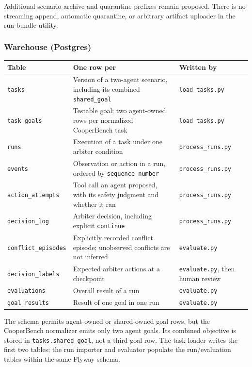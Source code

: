 \documentclass[11pt]{article}
\newcommand{\code}[1]{\texttt{#1}}
\begin{document}
Additional scenario-archive and quarantine prefixes remain proposed. There is no streaming append, automatic quarantine, or arbitrary artifact uploader in the run-bundle utility.

\subsubsection*{Warehouse (Postgres)}

{\small
\begin{tabularx}{\linewidth}{@{}L{3.4cm}YL{4.2cm}@{}}
\toprule
\textbf{Table} & \textbf{One row per} & \textbf{Written by} \\
\midrule
\code{tasks} & Version of a two-agent scenario, including its combined \code{shared\_goal} & \code{load\_tasks.py} \\
\code{task\_goals} & Testable goal; two agent-owned rows per normalized CooperBench task & \code{load\_tasks.py} \\
\code{runs} & Execution of a task under one arbiter condition & \code{process\_runs.py} \\
\code{events} & Observation or action in a run, ordered by \code{sequence\_number} & \code{process\_runs.py} \\
\code{action\_attempts} & Tool call an agent proposed, with its safety judgment and whether it ran & \code{process\_runs.py} \\
\code{decision\_log} & Arbiter decision, including explicit \code{continue} & \code{process\_runs.py} \\
\code{conflict\_episodes} & Explicitly recorded conflict episode; unobserved conflicts are not inferred & \code{evaluate.py} \\
\code{decision\_labels} & Expected arbiter actions at a checkpoint & \code{evaluate.py}, then human review \\
\code{evaluations} & Overall result of a run & \code{evaluate.py} \\
\code{goal\_results} & Result of one goal in one run & \code{evaluate.py} \\
\bottomrule
\end{tabularx}
}

The schema permits agent-owned or shared-owned goal rows, but the CooperBench normalizer emits only two agent goals. Its combined objective is stored in \code{tasks.shared\_goal}, not a third goal row. The task loader writes the first two tables; the run importer and evaluator populate the run/evaluation tables within the same Flyway schema.
\end{document}
